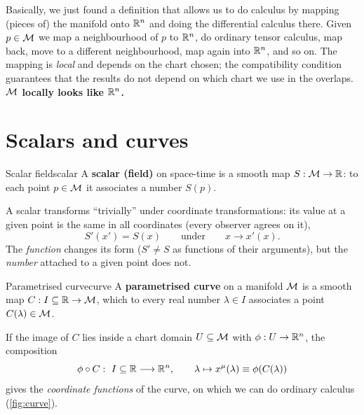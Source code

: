 \begin{remarkbox}
Basically, we just found a definition that allows us to do calculus by mapping (pieces of) the manifold onto $\mathbb{R}^n$ and doing the differential calculus there. Given $p\in\mathcal{M}$ we map a neighbourhood of $p$ to $\mathbb{R}^n$, do ordinary tensor calculus, map back, move to a different neighbourhood, map again into $\mathbb{R}^n$, and so on. The mapping is \emph{local} and depends on the chart chosen; the compatibility condition guarantees that the results do not depend on which chart we use in the overlaps. \textbf{$\mathcal{M}$ locally looks like $\mathbb{R}^n$.}
\end{remarkbox}

\section{Scalars and curves}

\begin{definition}{Scalar field}{scalar}
A \textbf{scalar (field)} on space-time is a smooth map $S:\mathcal{M}\to\mathbb{R}$: to each point $p\in\mathcal{M}$ it associates a number $S(p)$.
\end{definition}
A scalar transforms ``trivially'' under coordinate transformations: its value at a given point is the same in all coordinates (every observer agrees on it),
\begin{equation}
  S'(x')=S(x)\qquad\text{under}\qquad x\to x'(x).
\end{equation}
The \emph{function} changes its form ($S'\neq S$ as functions of their arguments), but the \emph{number} attached to a given point does not.

\begin{definition}{Parametrised curve}{curve}
A \textbf{parametrised curve} on a manifold $\mathcal{M}$ is a smooth map $C:I\subseteq\mathbb{R}\to\mathcal{M}$, which to every real number $\lambda\in I$ associates a point $C(\lambda)\in\mathcal{M}$.
\end{definition}
If the image of $C$ lies inside a chart domain $U\subseteq\mathcal{M}$ with $\phi:U\to\mathbb{R}^n$, the composition
\begin{equation}
  \phi\circ C:\ I\subseteq\R\longrightarrow\R^n,\qquad \lambda\mapsto x^\mu(\lambda)\equiv\phi(C(\lambda))
\end{equation}
gives the \emph{coordinate functions} of the curve, on which we can do ordinary calculus (\cref{fig:curve}).

